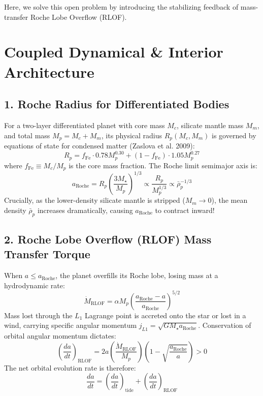 \documentclass[11pt,a4paper]{article}
\begin{document}
Here, we solve this open problem by introducing the stabilizing feedback of mass-transfer Roche Lobe Overflow (RLOF).

\section{Coupled Dynamical \& Interior Architecture}

\subsection{1. Roche Radius for Differentiated Bodies}
For a two-layer differentiated planet with core mass $M_c$, silicate mantle mass $M_m$, and total mass $M_p = M_c + M_m$, its physical radius $R_p(M_c, M_m)$ is governed by equations of state for condensed matter (Zaslova et al. 2009):
\begin{equation}
R_p = f_{\text{Fe}} \cdot 0.78 M_p^{0.30} + (1 - f_{\text{Fe}}) \cdot 1.05 M_p^{0.27}
\end{equation}
where $f_{\text{Fe}} \equiv M_c / M_p$ is the core mass fraction. The Roche limit semimajor axis is:
\begin{equation}
a_{\text{Roche}} = R_p \left( \frac{3 M_\star}{M_p} \right)^{1/3} \propto \frac{R_p}{M_p^{1/3}} \propto \bar{\rho}_p^{-1/3}
\end{equation}
Crucially, as the lower-density silicate mantle is stripped ($M_m \to 0$), the mean density $\bar{\rho}_p$ increases dramatically, causing $a_{\text{Roche}}$ to contract inward!

\subsection{2. Roche Lobe Overflow (RLOF) Mass Transfer Torque}
When $a \le a_{\text{Roche}}$, the planet overfills its Roche lobe, losing mass at a hydrodynamic rate:
\begin{equation}
\dot{M}_{\text{RLOF}} = \alpha M_p \left( \frac{a_{\text{Roche}} - a}{a_{\text{Roche}}} \right)^{5/2}
\end{equation}
Mass lost through the $L_1$ Lagrange point is accreted onto the star or lost in a wind, carrying specific angular momentum $j_{L1} = \sqrt{G M_\star a_{\text{Roche}}}$. Conservation of orbital angular momentum dictates:
\begin{equation}
\left( \frac{da}{dt} \right)_{\text{RLOF}} = 2 a \left( \frac{\dot{M}_{\text{RLOF}}}{M_p} \right) \left( 1 - \sqrt{\frac{a_{\text{Roche}}}{a}} \right) > 0
\end{equation}
The net orbital evolution rate is therefore:
\begin{equation}
\frac{da}{dt} = \left( \frac{da}{dt} \right)_{\text{tide}} + \left( \frac{da}{dt} \right)_{\text{RLOF}}
\end{equation}
\end{document}
